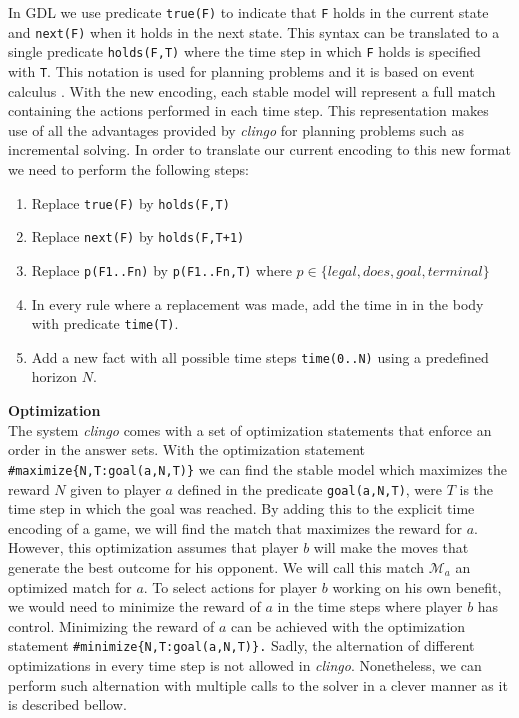 In GDL we use predicate \texttt{true(F)} to indicate that \texttt{F} holds in the current state and \texttt{next(F)} when it holds in the next state. This syntax can be translated to a single predicate \texttt{holds(F,T)} where the time step in which \texttt{F} holds is specified with \texttt{T}. This notation is used for planning problems and it is based on event calculus \cite{shanahan1999event}. 
With the new encoding, each stable model will represent a full match containing the actions performed in each time step.
This representation makes use of all the advantages provided by \textit{clingo} for planning problems such as incremental solving. In order to translate our current encoding to this new format we need to perform the following steps:
\begin{enumerate}
\item Replace \texttt{true(F)} by \texttt{holds(F,T)}
\item Replace \texttt{next(F)} by \texttt{holds(F,T+1)}
\item Replace \texttt{p(F1..Fn)} by \texttt{p(F1..Fn,T)} where $p\in \{ legal,does,goal,terminal\}$
\item In every rule where a replacement was made, add the time in in the body with predicate \texttt{time(T)}.
\item Add a new fact with all possible time steps \texttt{time(0..N)} using a predefined horizon $N$.
\end{enumerate}


\vspace{10px}
\textbf{Optimization}\\

The system \textit{clingo} comes with a set of optimization statements that enforce an order in the answer sets. With the optimization statement \\ 
\texttt{\#maximize\{N,T:goal(a,N,T)\}} 
we can find the stable model which maximizes the reward $N$ given to player $a$ defined in the predicate \texttt{goal(a,N,T)}, 
were $T$ is the time step in which the goal was reached. By adding this to the explicit time encoding of a game, we will find the match that maximizes the reward for $a$. 
However, this optimization assumes that player $b$ will make the moves that generate the best outcome for his opponent. 
We will call this match $\mathcal{M}_a$ an optimized match for $a$. 
To select actions for player $b$ working on his own benefit, we would need to minimize the reward of $a$ in the time steps where player $b$ has control. 
Minimizing the reward of $a$ can be achieved with the optimization statement 
\texttt{\#minimize\{N,T:goal(a,N,T)\}.} Sadly, the alternation of different optimizations in every time step is not allowed in \textit{clingo}. Nonetheless, we can perform such alternation with multiple calls to the solver in a clever manner as it is described bellow. 

